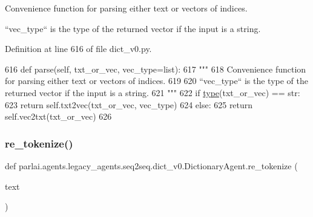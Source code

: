 \begin{DoxyVerb}Convenience function for parsing either text or vectors of indices.

``vec_type`` is the type of the returned vector if the input is a string.
\end{DoxyVerb}
 

Definition at line 616 of file dict\+\_\+v0.\+py.


\begin{DoxyCode}
616     \textcolor{keyword}{def }parse(self, txt\_or\_vec, vec\_type=list):
617         \textcolor{stringliteral}{"""}
618 \textcolor{stringliteral}{        Convenience function for parsing either text or vectors of indices.}
619 \textcolor{stringliteral}{}
620 \textcolor{stringliteral}{        ``vec\_type`` is the type of the returned vector if the input is a string.}
621 \textcolor{stringliteral}{        """}
622         \textcolor{keywordflow}{if} \hyperlink{namespaceparlai_1_1agents_1_1tfidf__retriever_1_1build__tfidf_ad5dfae268e23f506da084a9efb72f619}{type}(txt\_or\_vec) == str:
623             \textcolor{keywordflow}{return} self.txt2vec(txt\_or\_vec, vec\_type)
624         \textcolor{keywordflow}{else}:
625             \textcolor{keywordflow}{return} self.vec2txt(txt\_or\_vec)
626 
\end{DoxyCode}
\mbox{\label{classparlai_1_1agents_1_1legacy__agents_1_1seq2seq_1_1dict__v0_1_1DictionaryAgent_a11a20a1798b9c939e2b7347b9d799e7b}} 
\subsubsection{\texorpdfstring{re\+\_\+tokenize()}{re\_tokenize()}}
{\footnotesize\ttfamily def parlai.\+agents.\+legacy\+\_\+agents.\+seq2seq.\+dict\+\_\+v0.\+Dictionary\+Agent.\+re\+\_\+tokenize (\begin{DoxyParamCaption}\item[{}]{text }\end{DoxyParamCaption})\hspace{0.3cm}{\ttfamily [static]}}

